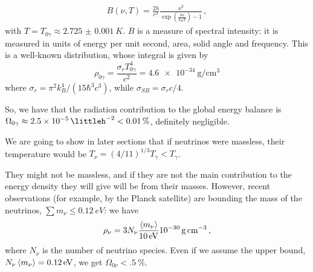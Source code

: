 \documentclass[main.tex]{subfiles}
\begin{document}
%
\begin{align}
B (\nu, T) = \frac{2 h}{c^2} \frac{\nu^3}{\exp(\frac{h \nu }{k_B T}) - 1}
\,,
\end{align}
%
with \(T = T_{0 \gamma } \approx \SI{2.725(1)}{K}\). \(B\) is a measure of spectral intensity: it is measured in units of energy per unit second, area, solid angle and frequency. This is a well-known distribution, whose integral is given by
%
\begin{equation}
  \rho_{0 \gamma} = \frac{\sigma_r T_{0 \gamma}^4}{c^2} = \SI{4.6e-34}{\gram\per\centi\metre\cubed}
\end{equation}
%
where \(\sigma_r = \pi^2 k_B^4 / (15 \hbar ^3 c^3)\), while \(\sigma_{SB} = \sigma_r c /4\).


So, we have that the radiation contribution to the global energy balance is \(\Omega_{0 \gamma } \approx \SI{2.5e-5}{\littleh^{-2}} < \SI{.01}{\percent}\), definitely negligible.


We are going to show in later sections
that if neutrinos were massless, their temperature would be \(T_\nu = (4/11)^{1/3} T_\gamma < T_\gamma \).

They might not be massless, and if they are not the main contribution to the energy density they will give will be from their masses.
However, recent observations (for example, by the Planck satellite) are bounding the mass of the neutrinos,
\(\sum m_\nu \leq \SI{0.12}{eV} \): we have 
%
\begin{equation}
\rho_\nu = 3 N_\nu \frac{\expval{m_\nu} }{\SI{10}{eV}} \SI{e-30}{\gram\per\cubic\centi\metre}
\,,
\end{equation}
%
where \(N_{\nu }\) is the number of neutrino species. 
Even if we assume the upper bound, \(N_{\nu } \expval{m_{\nu }} = \SI{.12}{eV}\), we get \(\Omega_{0 \nu } < \SI{.5}{\percent}\). 
\end{document}
